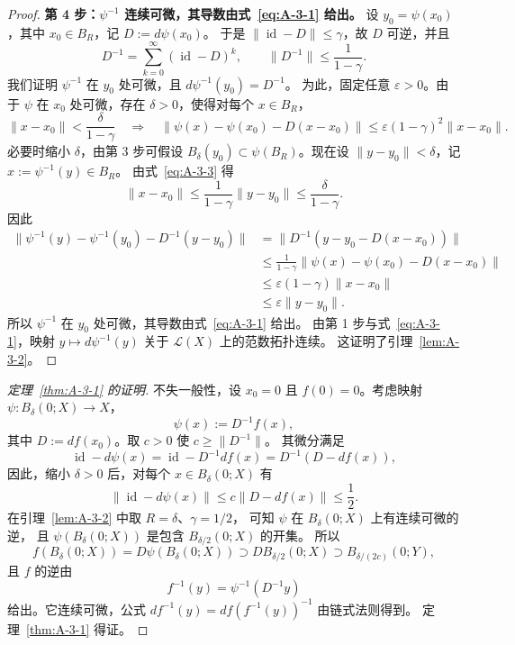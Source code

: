 \begin{proof}
\noindent\textbf{第 4 步：$\psi^{-1}$ 连续可微，其导数由式~\eqref{eq:A-3-1} 给出。}
设 $y_0=\psi(x_0)$，其中 $x_0\in B_R$，记 $D:=d\psi(x_0)$。
于是 $\|\operatorname{id}-D\|\le\gamma$，故 $D$ 可逆，并且
\[
  D^{-1}=\sum_{k=0}^{\infty}(\operatorname{id}-D)^k,
  \qquad \|D^{-1}\|\le\frac1{1-\gamma}.
\]
我们证明 $\psi^{-1}$ 在 $y_0$ 处可微，且
$d\psi^{-1}(y_0)=D^{-1}$。
为此，固定任意 $\varepsilon>0$。由于 $\psi$ 在 $x_0$ 处可微，存在
$\delta>0$，使得对每个 $x\in B_R$，
\[
  \|x-x_0\|<\frac\delta{1-\gamma}
  \quad\Longrightarrow\quad
  \|\psi(x)-\psi(x_0)-D(x-x_0)\|
  \le\varepsilon(1-\gamma)^2\|x-x_0\|.
\]
必要时缩小 $\delta$，由第 3 步可假设
$B_\delta(y_0)\subset\psi(B_R)$。现在设
$\|y-y_0\|<\delta$，记 $x:=\psi^{-1}(y)\in B_R$。
由式~\eqref{eq:A-3-3} 得
\[
  \|x-x_0\|\le\frac1{1-\gamma}\|y-y_0\|
  \le\frac\delta{1-\gamma}.
\]
因此
\[
\begin{aligned}
  \|\psi^{-1}(y)-\psi^{-1}(y_0)-D^{-1}(y-y_0)\|
  &=\|D^{-1}(y-y_0-D(x-x_0))\|\\
  &\le\frac1{1-\gamma}
   \|\psi(x)-\psi(x_0)-D(x-x_0)\|\\
  &\le\varepsilon(1-\gamma)\|x-x_0\|\\
  &\le\varepsilon\|y-y_0\|.
\end{aligned}
\]
所以 $\psi^{-1}$ 在 $y_0$ 处可微，其导数由式~\eqref{eq:A-3-1} 给出。
由第 1 步与式~\eqref{eq:A-3-1}，映射
$y\mapsto d\psi^{-1}(y)$ 关于 $\mathcal L(X)$ 上的范数拓扑连续。
这证明了引理~\ref{lem:A-3-2}。
\end{proof}

\begin{proof}[定理~\ref{thm:A-3-1} 的证明]
不失一般性，设 $x_0=0$ 且 $f(0)=0$。考虑映射
$\psi:B_\delta(0;X)\to X$，
\[
  \psi(x):=D^{-1}f(x),
\]
其中 $D:=df(x_0)$。取 $c>0$ 使 $c\ge\|D^{-1}\|$。
其微分满足
\[
  \operatorname{id}-d\psi(x)
  =\operatorname{id}-D^{-1}df(x)
  =D^{-1}(D-df(x)),
\]
因此，缩小 $\delta>0$ 后，对每个 $x\in B_\delta(0;X)$ 有
\[
  \|\operatorname{id}-d\psi(x)\|
  \le c\|D-df(x)\|\le\frac12.
\]
在引理~\ref{lem:A-3-2} 中取 $R=\delta$、$\gamma=1/2$，
可知 $\psi$ 在 $B_\delta(0;X)$ 上有连续可微的逆，
且 $\psi(B_\delta(0;X))$ 是包含 $B_{\delta/2}(0;X)$ 的开集。
所以
\[
  f(B_\delta(0;X))
  =D\psi(B_\delta(0;X))
  \supset DB_{\delta/2}(0;X)
  \supset B_{\delta/(2c)}(0;Y),
\]
且 $f$ 的逆由
\[
  f^{-1}(y)=\psi^{-1}(D^{-1}y)
\]
给出。它连续可微，公式
$df^{-1}(y)=df(f^{-1}(y))^{-1}$ 由链式法则得到。
定理~\ref{thm:A-3-1} 得证。
\end{proof}

